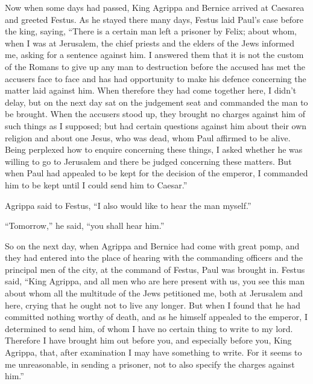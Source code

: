  Now when some days had passed, King Agrippa and Bernice
arrived at Caesarea and greeted Festus.  As he stayed
there many days, Festus laid Paul's case before the king, saying,
``There is a certain man left a prisoner by Felix;  about
whom, when I was at Jerusalem, the chief priests and the elders of the
Jews informed me, asking for a sentence against him.  I
answered them that it is not the custom of the Romans to give up any man
to destruction before the accused has met the accusers face to face and
has had opportunity to make his defence concerning the matter laid
against him.  When therefore they had come together here,
I didn't delay, but on the next day sat on the judgement seat and
commanded the man to be brought.  When the accusers stood
up, they brought no charges against him of such things as I supposed;
 but had certain questions against him about their own
religion and about one Jesus, who was dead, whom Paul affirmed to be
alive.  Being perplexed how to enquire concerning these
things, I asked whether he was willing to go to Jerusalem and there be
judged concerning these matters.  But when Paul had
appealed to be kept for the decision of the emperor, I commanded him to
be kept until I could send him to Caesar.''

 Agrippa said to Festus, ``I also would like to hear the
man myself.''

``Tomorrow,'' he said, ``you shall hear him.''

 So on the next day, when Agrippa and Bernice had come
with great pomp, and they had entered into the place of hearing with the
commanding officers and the principal men of the city, at the command of
Festus, Paul was brought in.  Festus said, ``King
Agrippa, and all men who are here present with us, you see this man
about whom all the multitude of the Jews petitioned me, both at
Jerusalem and here, crying that he ought not to live any longer.
 But when I found that he had committed nothing worthy of
death, and as he himself appealed to the emperor, I determined to send
him,  of whom I have no certain thing to write to my
lord. Therefore I have brought him out before you, and especially before
you, King Agrippa, that, after examination I may have something to
write.  For it seems to me unreasonable, in sending a
prisoner, not to also specify the charges against him.''

